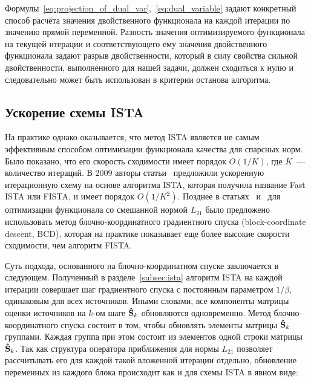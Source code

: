 Формулы~\ref{eq:projection_of_dual_var},~\ref{eq:dual_variable} задают
конкретный способ расчёта значения двойственного функционала на каждой итерации
по значению прямой переменной. Разность значения оптимизируемого функционала
на текущей итерации и соответствующего ему значения двойственного функционала
задают разрыв двойственности, который в силу свойства сильной двойственности,
выполненного для нашей задачи, должен сходиться к нулю и следовательно может быть
использован в критерии останова алгоритма.




\subsection{Ускорение схемы ISTA}\label{sec:ista_enhancements}

На практике однако оказывается, что метод
ISTA является не самым эффективным способом оптимизации функционала качества
для спарсных норм. Было показано, что его скорость сходимости имеет порядок
$O(1/K)$, где $K$~--- количество итераций. В 2009 авторы статьи~\cite{Beck2009}
предложили ускоренную итерационную схему на основе
алгоритма ISTA, которая получила название Fast ISTA или FISTA, и имеет порядок
$O(1/K^2)$. Позднее в статьях~\cite{Rakotomamonjy2011} и~\cite{Qin2013} для
оптимизации функционала со смешанной нормой $L_{21}$ было предложено
использовать метод блочно-координатного градиентного спуска (block-coordinate
descent, BCD), которая на практике показывает еще более высокие скорости сходимости,
чем алгоритм FISTA.\@

Суть подхода, основанного на блочно-координатном спуске заключается в следующем.
Полученный в разделе~\ref{subsec:ista} алгоритм ISTA на каждой
итерации совершает шаг градиентного спуска с постоянным параметром $1/\beta$,
одинаковым для всех источников. Иными словами, все компоненты матрицы 
оценки источников на $k$-ом шаге $\mathbf{\hat{S}}_k$ обновляются одновременно.
Метод блочно-координатного спуска состоит в том, чтобы обновлять элементы матрицы $\mathbf{\hat{S}}_k$
группами. Каждая группа при этом состоит из элементов одной строки матрицы $\mathbf{\hat{S}}_k$.
Так как структура оператора приближения для нормы $L_{21}$ позволяет
рассчитывать его для каждой такой вложенной итерации отдельно, обновление переменных из
каждого блока происходит как и для схемы ISTA в явном виде:

